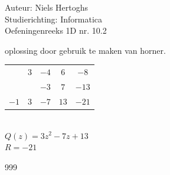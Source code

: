 \documentclass[a4paper]{article}
\begin{document}
\noindent \large Auteur: Niels Hertoghs			\\
\noindent \large Studierichting: Informatica \\
\noindent \large Oefeningenreeks 1D nr. 10.2  \\

\medskip

\normalsize

oplossing door gebruik te maken van horner.\\

\begin{tabular}{c|ccc|c}
&$3$ & $-4$ & $6$ & $-8$	 \\
&  & $-3$ & $7$ & $-13$ 	\\
\hline $-1$ & $3$ & $-7$ & $13$ & $-21$
\end{tabular}\\


$Q(z) = 3z^2-7z +13$\\

$R = -21 $\\

\begin{thebibliography}{999}
\end{thebibliography}
\end{document}
